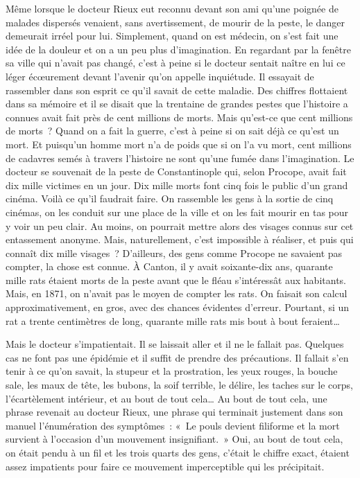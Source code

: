 \documentclass[french,twoside]{book} %
\begin{document}
Même lorsque le docteur Rieux eut reconnu devant son ami qu’une poignée de malades dispersés venaient, sans avertissement, de mourir de la peste, le danger demeurait irréel pour lui. Simplement, quand on est médecin, on s’est fait une idée de la douleur et on a un peu plus d’imagination. En regardant par la fenêtre sa ville qui n’avait pas changé, c’est à peine si le docteur sentait naître en lui ce léger écœurement devant l’avenir qu’on appelle inquiétude. Il essayait de rassembler dans son esprit ce qu’il savait de cette maladie. Des chiffres flottaient dans sa mémoire et il se disait que la trentaine de grandes pestes que l’histoire a connues avait fait près de cent millions de morts. Mais qu’est-ce que cent millions de morts ? Quand on a fait la guerre, c’est à peine si on sait déjà ce qu’est un mort. Et puisqu’un homme mort n’a de poids que si on l’a vu mort, cent millions de cadavres semés à travers l’histoire ne sont qu’une fumée dans l’imagination. Le docteur se souvenait de la peste de Constantinople qui, selon Procope, avait fait dix mille victimes en un jour. Dix mille morts font cinq fois le public d’un grand cinéma. Voilà ce qu’il faudrait faire. On rassemble les gens à la sortie de cinq cinémas, on les conduit sur une place de la ville et on les fait mourir en tas pour y voir un peu clair. Au moins, on pourrait mettre alors des visages connus sur cet entassement anonyme. Mais, naturellement, c’est impossible à réaliser, et puis qui connaît dix mille visages ? D’ailleurs, des gens comme Procope ne savaient pas compter, la chose est connue. À Canton, il y avait soixante-dix ans, quarante mille rats étaient morts de la peste avant que le fléau s’intéressât aux habitants. Mais, en 1871, on n’avait pas le moyen de compter les rats. On faisait son calcul approximativement, en gros, avec des chances évidentes d’erreur. Pourtant, si un rat a trente centimètres de long, quarante mille rats mis bout à bout feraient…\par
Mais le docteur s’impatientait. Il se laissait aller et il ne le fallait pas. Quelques cas ne font pas une épidémie et il suffit de prendre des précautions. Il fallait s’en tenir à ce qu’on savait, la stupeur et la prostration, les yeux rouges, la bouche sale, les maux de tête, les bubons, la soif terrible, le délire, les taches sur le corps, l’écartèlement intérieur, et au bout de tout cela… Au bout de tout cela, une phrase revenait au docteur Rieux, une phrase qui terminait justement dans son manuel l’énumération des symptômes : « Le pouls devient filiforme et la mort survient à l’occasion d’un mouvement insignifiant. » Oui, au bout de tout cela, on était pendu à un fil et les trois quarts des gens, c’était le chiffre exact, étaient assez impatients pour faire ce mouvement imperceptible qui les précipitait.\par
\end{document}
